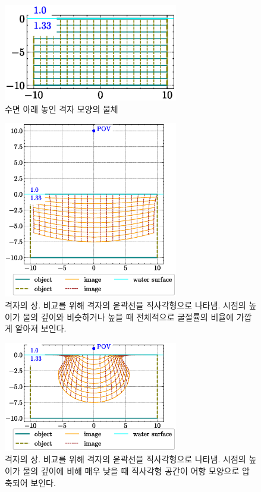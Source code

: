 \documentclass[twocolumn]{article}
\begin{document}
\begin{figure}
	\centering
	\includegraphics[width=3in]{figs/grid_underwater.eps}
	\caption{수면 아래 놓인 격자 모양의 물체}
	\label{fig:grid_underwater}
\end{figure}

\begin{figure}
	\centering
	\includegraphics[width=3in]{figs/image_underwater1.eps}
	\caption{격자의 상. 비교를 위해 격자의 윤곽선을 직사각형으로 나타냄. 시점의 높이가 물의 깊이와 비슷하거나 높을 때 전체적으로 굴절률의 비율에 가깝게 얕아져 보인다.}
	\label{fig:image_underwater}
\end{figure}

\begin{figure}
	\centering
	\includegraphics[width=3in]{figs/fishjar.eps}
	\caption{격자의 상. 비교를 위해 격자의 윤곽선을 직사각형으로 나타냄. 시점의 높이가 물의 깊이에 비해 매우 낮을 때 직사각형 공간이 어항 모양으로 압축되어 보인다.}
	\label{fig:fishbowl}
\end{figure}
\end{document}
